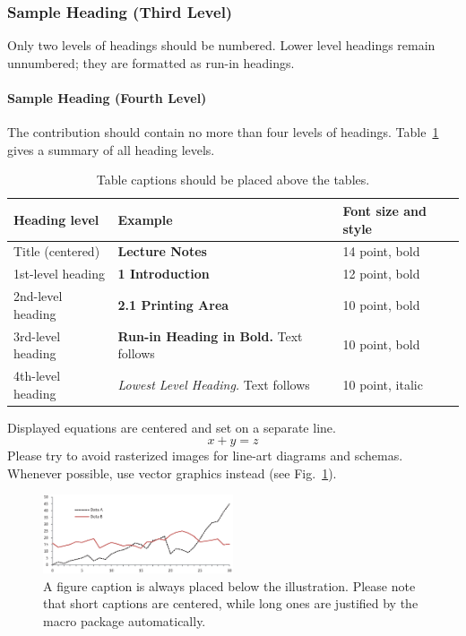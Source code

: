 \documentclass[runningheads]{llncs}
\begin{document}
\subsubsection{Sample Heading (Third Level)} Only two levels of
headings should be numbered. Lower level headings remain unnumbered;
they are formatted as run-in headings.

\paragraph{Sample Heading (Fourth Level)}
The contribution should contain no more than four levels of
headings. Table~\ref{tab1} gives a summary of all heading levels.

\begin{table}
\caption{Table captions should be placed above the
tables.}\label{tab1}
\begin{tabular}{|l|l|l|}
\hline
Heading level &  Example & Font size and style\\
\hline
Title (centered) &  {\Large\bfseries Lecture Notes} & 14 point, bold\\
1st-level heading &  {\large\bfseries 1 Introduction} & 12 point, bold\\
2nd-level heading & {\bfseries 2.1 Printing Area} & 10 point, bold\\
3rd-level heading & {\bfseries Run-in Heading in Bold.} Text follows & 10 point, bold\\
4th-level heading & {\itshape Lowest Level Heading.} Text follows & 10 point, italic\\
\hline
\end{tabular}
\end{table}


\noindent Displayed equations are centered and set on a separate
line.
\begin{equation}
x + y = z
\end{equation}
Please try to avoid rasterized images for line-art diagrams and
schemas. Whenever possible, use vector graphics instead (see
Fig.~\ref{fig1}).

\begin{figure}
\includegraphics[width=0.5\textwidth]{fig1.eps}
\caption{A figure caption is always placed below the illustration.
Please note that short captions are centered, while long ones are
justified by the macro package automatically.} \label{fig1}
\end{figure}
\end{document}
